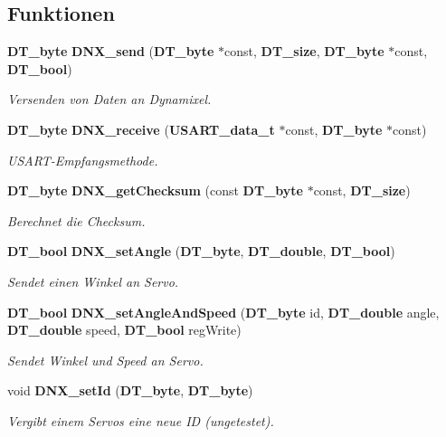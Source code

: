 \subsection*{Funktionen}
\begin{DoxyCompactItemize}
\item 
{\bf DT\_\-byte} {\bf DNX\_\-send} ({\bf DT\_\-byte} $\ast$const, {\bf DT\_\-size}, {\bf DT\_\-byte} $\ast$const, {\bf DT\_\-bool})
\begin{DoxyCompactList}\small\item\em Versenden von Daten an Dynamixel. \item\end{DoxyCompactList}\item 
{\bf DT\_\-byte} {\bf DNX\_\-receive} ({\bf USART\_\-data\_\-t} $\ast$const, {\bf DT\_\-byte} $\ast$const)
\begin{DoxyCompactList}\small\item\em USART-\/Empfangsmethode. \item\end{DoxyCompactList}\item 
{\bf DT\_\-byte} {\bf DNX\_\-getChecksum} (const {\bf DT\_\-byte} $\ast$const, {\bf DT\_\-size})
\begin{DoxyCompactList}\small\item\em Berechnet die Checksum. \item\end{DoxyCompactList}\item 
{\bf DT\_\-bool} {\bf DNX\_\-setAngle} ({\bf DT\_\-byte}, {\bf DT\_\-double}, {\bf DT\_\-bool})
\begin{DoxyCompactList}\small\item\em Sendet einen Winkel an Servo. \item\end{DoxyCompactList}\item 
{\bf DT\_\-bool} {\bf DNX\_\-setAngleAndSpeed} ({\bf DT\_\-byte} id, {\bf DT\_\-double} angle, {\bf DT\_\-double} speed, {\bf DT\_\-bool} regWrite)
\begin{DoxyCompactList}\small\item\em Sendet Winkel und Speed an Servo. \item\end{DoxyCompactList}\item 
void {\bf DNX\_\-setId} ({\bf DT\_\-byte}, {\bf DT\_\-byte})
\begin{DoxyCompactList}\small\item\em Vergibt einem Servos eine neue ID (ungetestet). \item\end{DoxyCompactList}\item 

\end{DoxyCompactItemize}
